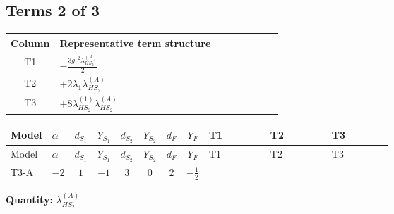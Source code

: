 \documentclass[8pt]{article}
\begin{document}
\begin{landscape}
\subsection*{Terms 2 of 3}
\begin{center}
\begin{tabular}{@{}c >{\raggedright\arraybackslash}p{0.82\linewidth}@{}}
\toprule
Column & Representative term structure \\
\midrule
T1 & \(\displaystyle -\frac{3 {g_1}^2 {\lambda_{HS_2}^{(A)}}}{2}\) \\
\midrule
T2 & \(\displaystyle +2 {\lambda_1} {\lambda_{HS_2}^{(A)}}\) \\
\midrule
T3 & \(\displaystyle +8 {\lambda_{HS_2}^{(1)}} {\lambda_{HS_2}^{(A)}}\) \\
\midrule
\bottomrule
\end{tabular}
\end{center}
\smallskip
\tiny
\begin{longtable}{@{}llcccccc >{\raggedright\arraybackslash}p{0.21\linewidth} >{\raggedright\arraybackslash}p{0.21\linewidth} >{\raggedright\arraybackslash}p{0.21\linewidth}@{}}
\toprule
Model & $\alpha$ & $d_{S_1}$ & $Y_{S_1}$ & $d_{S_2}$ & $Y_{S_2}$ & $d_F$ & $Y_F$ & T1 & T2 & T3 \\
\midrule
\endfirsthead
\toprule
Model & $\alpha$ & $d_{S_1}$ & $Y_{S_1}$ & $d_{S_2}$ & $Y_{S_2}$ & $d_F$ & $Y_F$ & T1 & T2 & T3 \\
\midrule
\endhead
T3-A & $-2$ & $1$ & $-1$ & $3$ & $0$ & $2$ & $-\frac{1}{2}$ & \scriptsize\adjustbox{max width=\linewidth}{$\begin{gathered} -\frac{3 {g_1}^2 {\lambda_{HS_2}^{(A)}}}{2}\end{gathered}$} & \scriptsize\adjustbox{max width=\linewidth}{$\begin{gathered} +2 {\lambda_1} {\lambda_{HS_2}^{(A)}}\end{gathered}$} & \scriptsize\adjustbox{max width=\linewidth}{$\begin{gathered} +8 {\lambda_{HS_2}^{(1)}} {\lambda_{HS_2}^{(A)}}\end{gathered}$} \\
\midrule
\bottomrule
\end{longtable}
\clearpage
\noindent\textbf{Quantity: }$\lambda_{HS_2}^{(A)}$\par\smallskip

\end{landscape}
\end{document}
